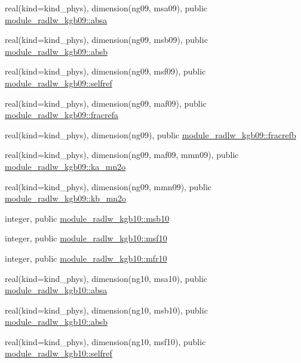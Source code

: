 \begin{DoxyCompactItemize}
\item 
real(kind=kind\+\_\+phys), dimension(ng09, msa09), public \hyperlink{group__module__radlw__main_ga7a8726efe46fac4d6cce55ca357199ab}{module\+\_\+radlw\+\_\+kgb09\+::absa}
\item 
real(kind=kind\+\_\+phys), dimension(ng09, msb09), public \hyperlink{group__module__radlw__main_gadb2110a245d9f01b3fd1ab058c883003}{module\+\_\+radlw\+\_\+kgb09\+::absb}
\item 
real(kind=kind\+\_\+phys), dimension(ng09, msf09), public \hyperlink{group__module__radlw__main_ga1c65e91a215060738292d0ca5a8f38a2}{module\+\_\+radlw\+\_\+kgb09\+::selfref}
\item 
real(kind=kind\+\_\+phys), dimension(ng09, maf09), public \hyperlink{group__module__radlw__main_gace3d3e2731609f7ea50eb798bd212f3b}{module\+\_\+radlw\+\_\+kgb09\+::fracrefa}
\item 
real(kind=kind\+\_\+phys), dimension(ng09), public \hyperlink{group__module__radlw__main_ga26476f00fe13c1c81d3ae0cf8e43c90b}{module\+\_\+radlw\+\_\+kgb09\+::fracrefb}
\item 
real(kind=kind\+\_\+phys), dimension(ng09, maf09, mmn09), public \hyperlink{group__module__radlw__main_ga37d98e8066c5995060a2a8451b45705f}{module\+\_\+radlw\+\_\+kgb09\+::ka\+\_\+mn2o}
\item 
real(kind=kind\+\_\+phys), dimension(ng09, mmn09), public \hyperlink{group__module__radlw__main_ga79326139db789012d47c4750917c2cdb}{module\+\_\+radlw\+\_\+kgb09\+::kb\+\_\+mn2o}
\item 
integer, public \hyperlink{group__module__radlw__main_gaf33570d793ca152588c14ce30ac30798}{module\+\_\+radlw\+\_\+kgb10\+::msb10}
\item 
integer, public \hyperlink{group__module__radlw__main_ga1b69c6fe99ed4ebc7b3d78b8f842b880}{module\+\_\+radlw\+\_\+kgb10\+::msf10}
\item 
integer, public \hyperlink{group__module__radlw__main_ga0f3944c4b86044e0c5db3dc351226c88}{module\+\_\+radlw\+\_\+kgb10\+::mfr10}
\item 
real(kind=kind\+\_\+phys), dimension(ng10, msa10), public \hyperlink{group__module__radlw__main_ga14f18538f77c1a3d651e36acf90baa19}{module\+\_\+radlw\+\_\+kgb10\+::absa}
\item 
real(kind=kind\+\_\+phys), dimension(ng10, msb10), public \hyperlink{group__module__radlw__main_gaf1e2252355a3002080be21ce37d45c3a}{module\+\_\+radlw\+\_\+kgb10\+::absb}
\item 
real(kind=kind\+\_\+phys), dimension(ng10, msf10), public \hyperlink{group__module__radlw__main_ga48247dea283a611ebe57dd1c164dda69}{module\+\_\+radlw\+\_\+kgb10\+::selfref}

\end{DoxyCompactItemize}
